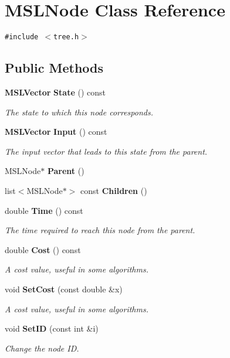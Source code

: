 \section{MSLNode  Class Reference}
\label{class_MSLNode}
{\tt \#include $<$tree.h$>$}

\subsection*{Public Methods}
\begin{CompactItemize}
\item 
{\bf MSLVector} {\bf State} () const
\begin{CompactList}\small\item\em The state to which this node corresponds.\item\end{CompactList}\item 
{\bf MSLVector} {\bf Input} () const
\begin{CompactList}\small\item\em The input vector that leads to this state from the parent.\item\end{CompactList}\item 
MSLNode$\ast$ {\bf Parent} ()
\item 
list$<$MSLNode$\ast$$>$ const {\bf Children} ()
\item 
double {\bf Time} () const
\begin{CompactList}\small\item\em The time required to reach this node from the parent.\item\end{CompactList}\item 
double {\bf Cost} () const
\begin{CompactList}\small\item\em A cost value, useful in some algorithms.\item\end{CompactList}\item 
void {\bf Set\-Cost} (const double \&x)
\begin{CompactList}\small\item\em A cost value, useful in some algorithms.\item\end{CompactList}\item 
void {\bf Set\-ID} (const int \&i)
\begin{CompactList}\small\item\em Change the node ID.\item\end{CompactList}\item 
$$
\end{CompactItemize}
